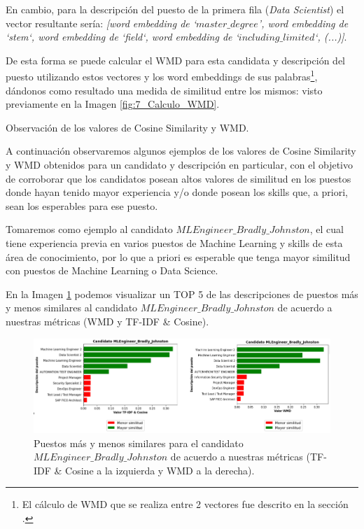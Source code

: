 \documentclass[12pt,a4paper]{article}
\makeatletter
\renewcommand\paragraph{\@startsection{paragraph}{4}{\z@}
            {-2.5ex\@plus -1ex \@minus -.25ex}
            {1.25ex \@plus .25ex}
            {\normalfont\normalsize\bfseries}}
\makeatother
\begin{document}
\begin{sloppypar}
En cambio, para la descripción del puesto de la primera fila (\textit{Data Scientist}) el vector resultante sería: \textit{[word embedding de ‘$master\_degree$', word embedding de ‘stem‘, word embedding de ‘field‘, word embedding de ‘$including\_limited$‘, (...)]}. 

De esta forma se puede calcular el WMD para esta candidata y descripción del puesto utilizando estos vectores y los word embeddings de sus palabras\footnote{El cálculo de WMD que se realiza entre 2 vectores fue descrito en la sección \textit{}.}, dándonos como resultado una medida de similitud entre los mismos: visto previamente en la Imagen \ref{fig:7_Calculo_WMD}.

\paragraph{Observación de los valores de Cosine Similarity y WMD.}\label{Obs_cos_y_wmd}

A continuación observaremos algunos ejemplos de los valores de Cosine Similarity y WMD obtenidos para un candidato y descripción en particular, con el objetivo de corroborar que los candidatos posean altos valores de similitud en los puestos donde hayan tenido mayor experiencia y/o donde posean los skills que, a priori, sean los esperables para ese puesto.

Tomaremos como ejemplo al candidato \textit{$MLEngineer\_Bradly\_Johnston$}, el cual tiene experiencia previa en varios puestos de Machine Learning y skills de esta área de conocimiento, por lo que a priori es esperable que tenga mayor similitud con puestos de Machine Learning o Data Science. 

En la Imagen \ref{fig:Valores_para_Bradly_Johnson} podemos visualizar un TOP 5 de las descripciones de puestos más y menos similares al candidato \textit{$MLEngineer\_Bradly\_Johnston$} de acuerdo a nuestras métricas (WMD y TF-IDF \& Cosine).
\\

\begin{figure}[H] 
 \centering
 \includegraphics[width=1\textwidth]{images/implementacion_5/Valores_para_Bradly_Johnson.png}
 \captionsetup{justification=centering,margin=2cm}
 \caption{Puestos más y menos similares para el candidato \textit{$MLEngineer\_Bradly\_Johnston$} de acuerdo a nuestras métricas (TF-IDF \& Cosine a la izquierda y WMD a la derecha).} 
 \label{fig:Valores_para_Bradly_Johnson}
\end{figure}


\end{sloppypar}
\end{document}
